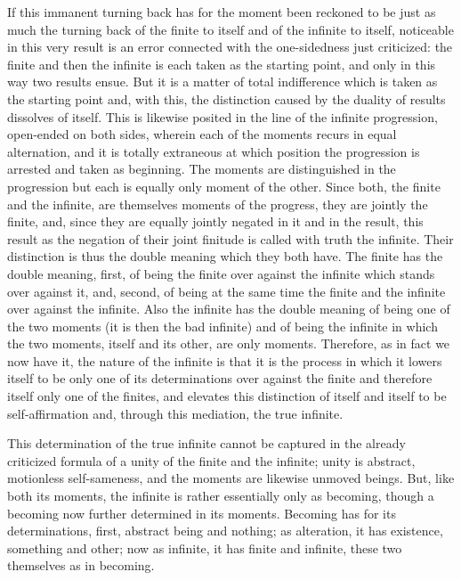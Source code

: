 If this immanent turning back has for the moment been reckoned
to be just as much the turning back of the finite to itself
and of the infinite to itself,
noticeable in this very result is an error connected
with the one-sidedness just criticized:
the finite and then the infinite is
each taken as the starting point,
and only in this way two results ensue.
But it is a matter of total indifference
which is taken as the starting point
and, with this, the distinction caused
by the duality of results dissolves of itself.
This is likewise posited in the line
of the infinite progression, open-ended on both sides,
wherein each of the moments recurs in equal alternation,
and it is totally extraneous at which position
the progression is arrested and taken as beginning.
The moments are distinguished in the progression
but each is equally only moment of the other.
Since both, the finite and the infinite,
are themselves moments of the progress,
they are jointly the finite,
and, since they are equally jointly negated in it and in the result,
this result as the negation of their joint finitude is
called with truth the infinite.
Their distinction is thus the double meaning which they both have.
The finite has the double meaning,
first, of being the finite over against the infinite
which stands over against it,
and, second, of being at the same time
the finite and the infinite over against the infinite.
Also the infinite has the double meaning
of being one of the two moments
(it is then the bad infinite)
and of being the infinite in which the two moments,
itself and its other, are only moments.
Therefore, as in fact we now have it,
the nature of the infinite is
that  it is the process in which it lowers itself
to be only one of its determinations over against the finite
and therefore itself only one of the finites,
and elevates this distinction of itself
and itself to be self-affirmation
and, through this mediation, the true infinite.

This determination of the true infinite
cannot be captured in the already criticized formula
of a unity of the finite and the infinite;
unity is abstract, motionless self-sameness,
and the moments are likewise unmoved beings.
But, like both its moments, the infinite is
rather essentially only as becoming,
though a becoming now further determined in its moments.
Becoming has for its determinations,
first, abstract being and nothing;
as alteration, it has existence, something and other;
now as infinite, it has finite and infinite,
these two themselves as in becoming.

